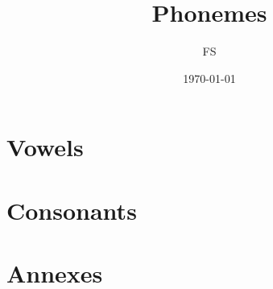 \documentclass[12pt,oneside]{book}
\begin{document}
\title{Phonemes}
\author{FS}
\date{\today}
\maketitle

\frontmatter
\tableofcontents
\mainmatter

\chapter{Vowels}







\chapter{Consonants}




\chapter{Annexes}

\end{document}
